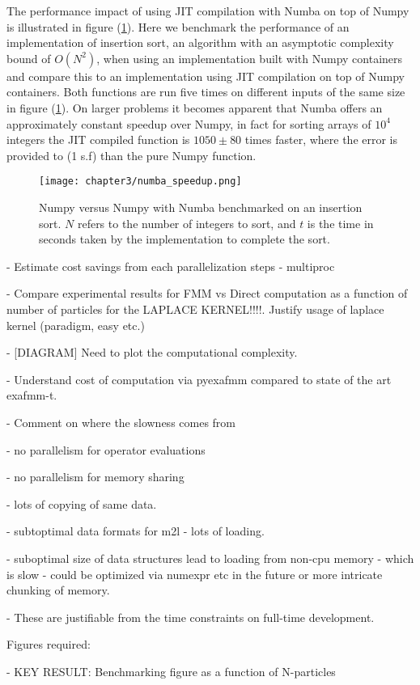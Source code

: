 The performance impact of using \gls{JIT} compilation with Numba on top of Numpy
is illustrated in figure (\ref{fig:3_1_numba}). Here we benchmark the performance
of an implementation of insertion sort, an algorithm with an asymptotic complexity
bound of $O(N^2)$, when using an implementation built with Numpy containers and
compare this to an implementation using JIT compilation on top of Numpy containers.
Both functions are run five times on different inputs of the same size
in figure (\ref{fig:3_1_numba}). On larger problems it becomes apparent
that Numba offers an approximately constant speedup over Numpy, in fact for
sorting arrays of $10^4$ integers the JIT compiled function is $1050 \pm 80$
times faster, where the error is provided to (1 s.f) than the pure Numpy function.

\begin{figure}[!h]
    \centering

  {\texttt{[image: chapter3/numba\_speedup.png]}}
  \vspace{0pt}
    \caption{Numpy versus Numpy with Numba benchmarked on an insertion sort. $N$
    refers to the number of integers to sort, and $t$ is the time in seconds taken
    by the implementation to complete the sort.}
    \label{fig:3_1_numba}
\end{figure}


- Estimate cost savings from each parallelization steps
    - multiproc

- Compare experimental results for FMM vs Direct computation as a function of number of particles for the LAPLACE KERNEL!!!!. Justify usage of laplace kernel (paradigm, easy etc.)

- [DIAGRAM] Need to plot the computational complexity.

- Understand cost of computation via pyexafmm compared to state of the art exafmm-t.

- Comment on where the slowness comes from

- no parallelism for operator evaluations

- no parallelism for memory sharing

- lots of copying of same data.

- subtoptimal data formats for m2l - lots of loading.

- suboptimal size of data structures lead to loading from non-cpu memory - which is slow - could be optimized via numexpr etc in the future or more intricate chunking of memory.

- These are justifiable from the time constraints on full-time development.

Figures required:

- KEY RESULT: Benchmarking figure as a function of N-particles
